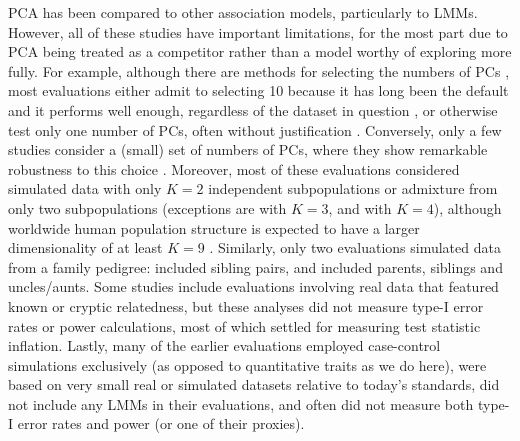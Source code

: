 \documentclass[11pt]{article}
\begin{document}
PCA has been compared to other association models, particularly to LMMs.
However, all of these studies have important limitations, for the most part due to PCA being treated as a competitor rather than a model worthy of exploring more fully.
For example, although there are methods for selecting the numbers of PCs \citep{patterson_population_2006}, most evaluations either admit to selecting 10 because it has long been the default and it performs well enough, regardless of the dataset in question \citep{epstein_simple_2007, li_improved_2008, astle_population_2009, li_correcting_2010, wu_comparison_2011}, or otherwise test only one number of PCs, often without justification \citep{zhang_semiparametric_2003, kimmel_randomization_2007, zhao_arabidopsis_2007, zhang_comparison_2008, price_new_2010, bouaziz_accounting_2011, hoffman_correcting_2013, tucker_improving_2014, yang_advantages_2014, song_testing_2015, sul_population_2018}.
Conversely, only a few studies consider a (small) set of numbers of PCs, where they show remarkable robustness to this choice \citep{price_principal_2006, kang_variance_2010, wojcik_genetic_2019}.
Moreover, most of these evaluations considered simulated data with only $K = 2$ independent subpopulations or admixture from only two subpopulations (exceptions are \citet{astle_population_2009} with $K=3$, and \citet{wu_comparison_2011} with $K = 4$), although worldwide human population structure is expected to have a larger dimensionality of at least $K = 9$ \citep{wojcik_genetic_2019}.
Similarly, only two evaluations simulated data from a family pedigree: \citet{price_new_2010} included sibling pairs, and \citet{thornton_roadtrips:_2010} included parents, siblings and uncles/aunts.
Some studies include evaluations involving real data that featured known or cryptic relatedness, but these analyses did not measure type-I error rates or power calculations, most of which settled for measuring test statistic inflation.
Lastly, many of the earlier evaluations employed case-control simulations exclusively (as opposed to quantitative traits as we do here), were based on very small real or simulated datasets relative to today's standards, did not include any LMMs in their evaluations, and often did not measure both type-I error rates and power (or one of their proxies).
\end{document}
